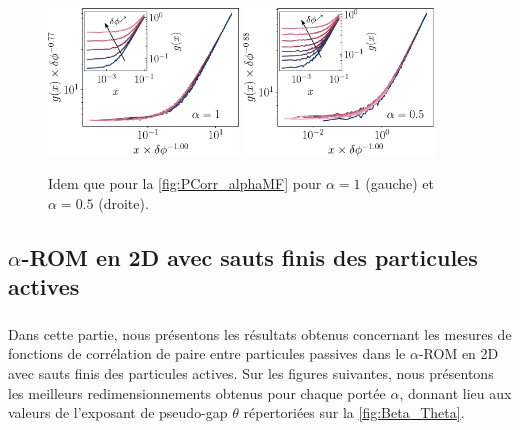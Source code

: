 \begin{figure}[h]
\centering
\includegraphics[width=0.45\textwidth]{Chapitre3/Figures/Interpretation/PCorrMF/PCorr_rescaled_MF_alpha1.pdf}
\includegraphics[width=0.45\textwidth]{Chapitre3/Figures/Interpretation/PCorrMF/PCorr_rescaled_MF_alpha05.pdf}
\caption{Idem que pour la \autoref{fig:PCorr_alphaMF} pour $\alpha = 1$ (gauche) et $\alpha = 0.5$ (droite).}
\label{fig:PCorrAnnexe4}
\end{figure}

\FloatBarrier

\subsection{$\alpha$-ROM en 2D avec sauts finis des particules actives}

\subparagraph{}Dans cette partie, nous présentons les résultats obtenus concernant les mesures de fonctions de corrélation de paire entre particules passives dans le $\alpha$-ROM en 2D avec sauts finis des particules actives. Sur les figures suivantes, nous présentons les meilleurs redimensionnements obtenus pour chaque portée $\alpha$, donnant lieu aux valeurs de l'exposant de pseudo-gap $\theta$ répertoriées sur la \autoref{fig:Beta_Theta}.

